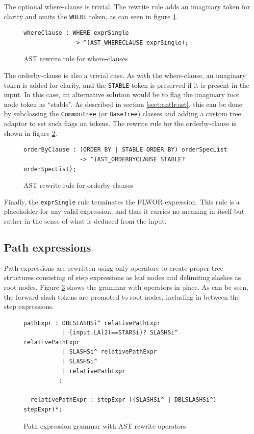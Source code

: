The optional where-clause is trivial. The rewrite rule adds an imaginary
token for clarity and omits the \verb!WHERE! token, as can seen in figure
\ref{code:ast:whereclause}.

\begin{figure}[h!]
\begin{verbatim} 
whereClause : WHERE exprSingle
              -> ^(AST_WHERECLAUSE exprSingle);
\end{verbatim}
\caption{AST rewrite rule for where-clauses}
\label{code:ast:whereclause}
\end{figure}

The orderby-clause is also a trivial case. As with the where-clause, an
imaginary token is added for clarity, and the \verb!STABLE! token is preserved
if it is present in the input. In this case, an alternative solution would be to
flag the imaginary root node token as ``stable''. As described in section 
\ref{sect:antlr:ast}, this can be done by subclassing the \verb!CommonTree! (or
\verb!BaseTree!) classes and adding a custom tree adaptor to set such flags on
tokens. The rewrite rule for the orderby-clause is shown in figure
\ref{code:ast:orderbyclause}.

\begin{figure}[h!]
\begin{verbatim} 
orderByClause : (ORDER BY | STABLE ORDER BY) orderSpecList
                -> ^(AST_ORDERBYCLAUSE STABLE? orderSpecList);
\end{verbatim}
\caption{AST rewrite rule for orderby-clauses}
\label{code:ast:orderbyclause}
\end{figure}

Finally, the \verb!exprSingle! rule terminates the FLWOR expression. This rule
is a placeholder for any valid expression, and thus it carries no meaning in
itself but rather in the sense of what is deduced from the input.


\subsection{Path expressions}
Path expressions are rewritten using only operators to create proper tree
structures consisting of step expressions as leaf nodes and delimiting slashes as
root nodes. Figure \ref{code:ast:pathexpr} shows the grammar with operators in
place. As can be seen, the forward slash tokens are promoted to root nodes,
including in between the step expressions.

\begin{figure}[h!]
\begin{verbatim} 
pathExpr : DBLSLASHSi^ relativePathExpr
           | {input.LA(2)==STARSi}? SLASHSi^ relativePathExpr
           | SLASHSi^ relativePathExpr
           | SLASHSi^
           | relativePathExpr
          ;

  relativePathExpr : stepExpr ((SLASHSi^ | DBLSLASHSi^) stepExpr)*;
\end{verbatim}
\caption{Path expression grammar with AST rewrite operators}
\label{code:ast:pathexpr}
\end{figure}


